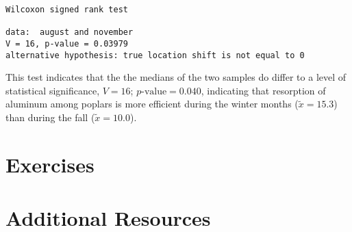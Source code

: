 \begin{framed}
\begin{Verbatim}[samepage=TRUE]
	Wilcoxon signed rank test

data:  august and november
V = 16, p-value = 0.03979
alternative hypothesis: true location shift is not equal to 0
\end{Verbatim}
\end{framed}

This test indicates that the the medians of the two samples do differ to a level of statistical significance, $V = 16$; $p\text{-value}=0.040$, indicating that resorption of aluminum among poplars is more efficient during the winter months ($\tilde{x}=15.3$) than during the fall ($\tilde{x}=10.0$).

\section{Exercises}

\section{Additional Resources}

